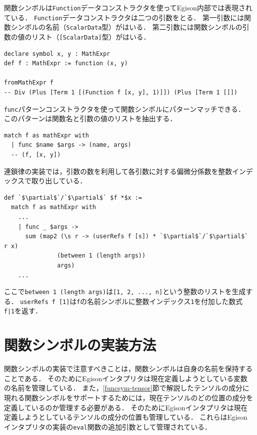 関数シンボルは\lstinline{Function}データコンストラクタを使ってEgison内部では表現されている．
\lstinline{Function}データコンストラクタは二つの引数をとる．
第一引数には関数シンボルの名前（\lstinline{ScalarData}型）がはいる．
第二引数には関数シンボルの引数の値のリスト（\lstinline{[ScalarData]}型）がはいる．

\begin{lstlisting}[language=egison,numbers=none]
declare symbol x, y : MathExpr
def f : MathExpr := function (x, y)

fromMathExpr f
-- Div (Plus [Term 1 [(Function f [x, y], 1)]]) (Plus [Term 1 []])
\end{lstlisting}

\lstinline{func}パターンコンストラクタを使って関数シンボルにパターンマッチできる．
このパターンは関数名と引数の値のリストを抽出する．

\begin{lstlisting}[language=egison,numbers=none]
match f as mathExpr with
  | func $name $args -> (name, args)
  -- (f, [x, y])
\end{lstlisting}

連鎖律の実装では，引数の数を利用して各引数に対する偏微分係数を整数インデックスで取り出している．

\begin{lstlisting}[language=egison,numbers=none]
def `$\partial$`/`$\partial$` $f *$x :=
  match f as mathExpr with
    ...
    | func _ $args ->
      sum (map2 (\s r -> (userRefs f [s]) * `$\partial$`/`$\partial$` r x)
               (between 1 (length args))
               args)
    ...
\end{lstlisting}

ここで\lstinline{between 1 (length args)}は\lstinline{[1, 2, ..., n]}という整数のリストを生成する．
\lstinline{userRefs f [1]}は\lstinline{f}の名前シンボルに整数インデックス\lstinline{1}を付加した数式\lstinline{f|1}を返す．

\section{関数シンボルの実装方法}

関数シンボルの実装で注意すべきことは，関数シンボルは自身の名前を保持することである．
そのためにEgisonインタプリタは現在定義しようとしている変数の名前を管理している．
また，\ref{funcsym-tensor}節で解説したテンソルの成分に現れる関数シンボルをサポートするためには，現在テンソルのどの位置の成分を定義しているのか管理する必要がある．
そのためにEgisonインタプリタは現在定義しようとしているテンソルの成分の位置も管理している．
これらはEgisonインタプリタの実装の\lstinline{eval}関数の追加引数として管理されている．
